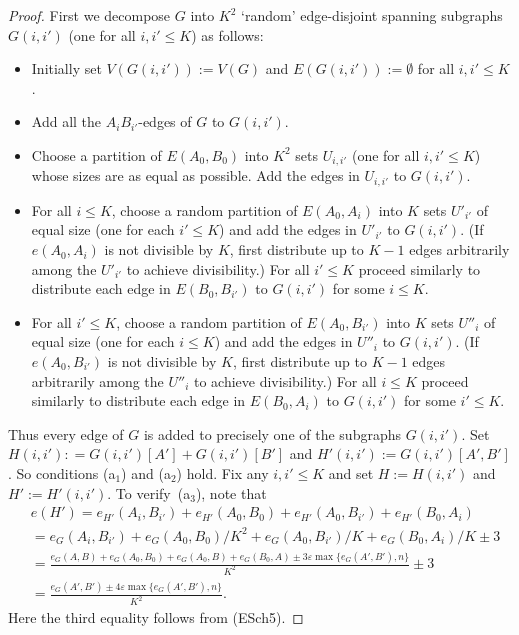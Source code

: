 \documentclass{memo-l}
\def\eps{\varepsilon}
\numberwithin{section}{chapter}
\numberwithin{equation}{section}
\numberwithin{firstthm}{section}
\numberwithin{figure}{section}
\begin{document}
\begin{proof}
First we decompose $G$ into $K^2$ `random' edge-disjoint spanning subgraphs $G(i,i')$ (one for all $i,i' \le K$)
as follows:
\begin{itemize}
\item Initially set $V(G(i,i')):=V(G)$ and $E(G(i,i')):=\emptyset$ for all $i,i' \le K$.
\item Add all the $A_iB_{i'}$-edges of $G$ to $G(i,i')$.
\item Choose a partition of $E(A_0,B_0)$ into $K^2$ sets $U_{i,i'}$ (one for all $i,i'\le K$) whose sizes are as
equal as possible. Add the edges in $U_{i,i'}$ to $G(i,i')$.
\item For all $i\le K$, choose a random partition of $E(A_0,A_i)$ into $K$ sets $U'_{i'}$ of equal size (one for each $i'\le K$)
and add the edges in $U'_{i'}$ to $G(i,i')$. (If $e(A_0,A_i)$ is not divisible by $K$, first distribute up to $K-1$ edges
arbitrarily among the $U'_{i'}$ to achieve divisibility.) For all $i'\le K$ proceed similarly to distribute each edge in $E(B_0,B_{i'})$
to $G(i,i')$ for some $i\le K$.
\item For all $i'\le K$, choose a random partition of $E(A_0,B_{i'})$ into $K$ sets $U''_{i}$ of equal size (one for each $i\le K$)
and add the edges in $U''_{i}$ to $G(i,i')$. (If $e(A_0,B_{i'})$ is not divisible by $K$, first distribute up to $K-1$ edges
arbitrarily among the $U''_{i}$ to achieve divisibility.) For all $i\le K$ proceed similarly to distribute each edge in $E(B_0,A_{i})$
to $G(i,i')$ for some $i'\le K$.
\end{itemize}
Thus every edge of $G$ is added to precisely one of the subgraphs $G(i,i')$.
Set $H(i,i'): = G(i,i')[A'] + G(i,i')[B']$ and $H'(i,i') :=  G(i,i')[A',B']$. %
So conditions (a$_1$) and (a$_2$) hold. Fix any $i, i' \le K$ and set $H:= H(i,i')$ and $H':=H'(i,i')$.
To verify~(a$_3$), note that
\begin{align*}
&e(H')  =e_{H'}(A_i,B_{i'})+e_{H'}(A_0,B_0)+e_{H'}(A_0,B_{i'})+e_{H'}(B_0,A_i)\\
& = e_{G}(A_i,B_{i'})+e_{G}(A_0,B_0)/K^2+e_{G}(A_0,B_{i'})/K+e_{G}(B_0,A_i)/K\pm 3\\
& = \frac{e_{G}(A,B)+e_{G}(A_0,B_0)+e_{G}(A_0,B)+e_{G}(B_0,A)\pm 3\eps \max \{e_G(A',B'), n \}}{K^2}\pm 3\\
& = \frac{e_{G}(A',B')\pm 4\eps \max \{e_G(A',B'), n \}}{K^2}.
\end{align*}
Here the third equality follows from (ESch5).


\end{proof}
\end{document}
